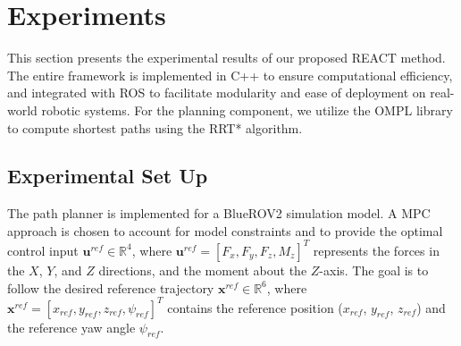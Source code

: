 \section{Experiments}
\label{sec:experiments}





%
%






This section presents the experimental results of our proposed \ac{REACT} method. The entire framework is implemented in C++ to ensure computational efficiency, and integrated with ROS to facilitate modularity and ease of deployment on real-world robotic systems. For the planning component, we utilize the \ac{OMPL} library \cite{ompl} to compute shortest paths using the RRT* algorithm.  


\subsection{Experimental Set Up}
The path planner is implemented for a BlueROV2 simulation model. A \ac{MPC} approach is chosen to account for model constraints and to provide the optimal control input $\mathbf{u}^{ref} \in \mathbb{R}^4$, where $\mathbf{u}^{ref} = [F_x, F_y, F_z, M_z]^T$ represents the forces in the $X$, $Y$, and $Z$ directions, and the moment about the $Z$-axis. The goal is to follow the desired reference trajectory $\mathbf{x}^{ref} \in \mathbb{R}^6$, where $\mathbf{x}^{ref} = [x_{ref}, y_{ref}, z_{ref}, \psi_{ref}]^T$ contains the reference position ($x_{ref}$, $y_{ref}$, $z_{ref}$) and the reference yaw angle $\psi_{ref}$.

